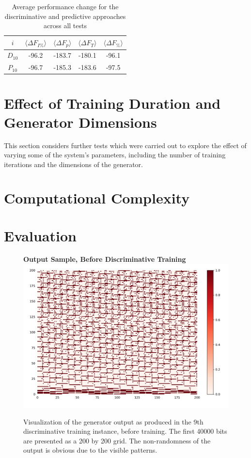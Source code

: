 \documentclass[12pt, titlepage]{report}
\theoremstyle{definition}
\begin{document}
\begin{table}
\begin{tabular}{cSSSS} \toprule
    {$i$}     & {$\langle \Delta F_{I\%} \rangle$}	& {$\langle \Delta F_p \rangle$} 	& {$\langle \Delta F_T \rangle$} 	& {$\langle \Delta F_{\%} \rangle$} \\ \midrule
    $D_{10}$ & -96.2 						& -183.7					& 	-180.1	  					& -96.1 \\ \midrule
    $P_{10}$ & -96.7  						& -185.3					& -183.6						& -97.5 \\ \bottomrule
\end{tabular}

\caption{Average performance change for the discriminative and predictive approaches across all tests}
\end{table}


\section{Effect of Training Duration and Generator Dimensions}
This section considers further tests which were carried out to explore the effect of varying some of the system's parameters, including the number of training iterations and the dimensions of the generator.

\section{Computational Complexity}




\section{Evaluation}\label{subsection:evaluation}

\begin{figure}
\centering
\textbf{Output Sample, Before Discriminative Training}
\includegraphics[width=1\textwidth]{img/discriminative_before}\\
\caption{Visualization of the generator output as produced in the 9th discriminative training instance, before training. The first 40000 bits are presented as a 200 by 200 grid. The non-randomness of the output is obvious due to the visible patterns.}
\label{figure:visualize_discriminative_before}
\end{figure}
\end{document}
